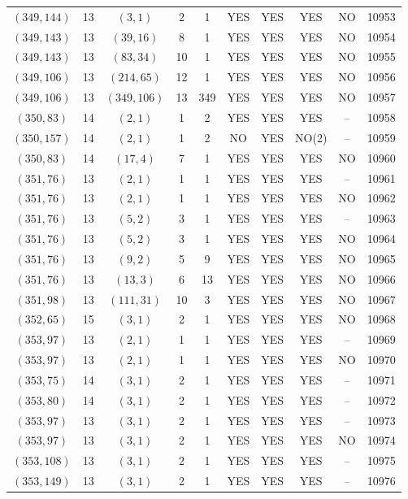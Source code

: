 \begin{longtable}{|c|c|c|c|c|c|c|c|c|c|}
$(349, 144)$ & 13 & $(3, 1)$ & 2 & 1 & YES & YES & YES & NO & 10953\\
$(349, 143)$ & 13 & $(39, 16)$ & 8 & 1 & YES & YES & YES & NO & 10954\\
$(349, 143)$ & 13 & $(83, 34)$ & 10 & 1 & YES & YES & YES & NO & 10955\\
$(349, 106)$ & 13 & $(214, 65)$ & 12 & 1 & YES & YES & YES & NO & 10956\\
$(349, 106)$ & 13 & $(349, 106)$ & 13 & 349 & YES & YES & YES & NO & 10957\\
$(350, 83)$ & 14 & $(2, 1)$ & 1 & 2 & YES & YES & YES & -- & 10958\\
$(350, 157)$ & 14 & $(2, 1)$ & 1 & 2 & NO & YES & NO(2) & -- & 10959\\
$(350, 83)$ & 14 & $(17, 4)$ & 7 & 1 & YES & YES & YES & NO & 10960\\
$(351, 76)$ & 13 & $(2, 1)$ & 1 & 1 & YES & YES & YES & -- & 10961\\
$(351, 76)$ & 13 & $(2, 1)$ & 1 & 1 & YES & YES & YES & NO & 10962\\
$(351, 76)$ & 13 & $(5, 2)$ & 3 & 1 & YES & YES & YES & -- & 10963\\
$(351, 76)$ & 13 & $(5, 2)$ & 3 & 1 & YES & YES & YES & NO & 10964\\
$(351, 76)$ & 13 & $(9, 2)$ & 5 & 9 & YES & YES & YES & NO & 10965\\
$(351, 76)$ & 13 & $(13, 3)$ & 6 & 13 & YES & YES & YES & NO & 10966\\
$(351, 98)$ & 13 & $(111, 31)$ & 10 & 3 & YES & YES & YES & NO & 10967\\
$(352, 65)$ & 15 & $(3, 1)$ & 2 & 1 & YES & YES & YES & NO & 10968\\
$(353, 97)$ & 13 & $(2, 1)$ & 1 & 1 & YES & YES & YES & -- & 10969\\
$(353, 97)$ & 13 & $(2, 1)$ & 1 & 1 & YES & YES & YES & NO & 10970\\
$(353, 75)$ & 14 & $(3, 1)$ & 2 & 1 & YES & YES & YES & -- & 10971\\
$(353, 80)$ & 14 & $(3, 1)$ & 2 & 1 & YES & YES & YES & -- & 10972\\
$(353, 97)$ & 13 & $(3, 1)$ & 2 & 1 & YES & YES & YES & -- & 10973\\
$(353, 97)$ & 13 & $(3, 1)$ & 2 & 1 & YES & YES & YES & NO & 10974\\
$(353, 108)$ & 13 & $(3, 1)$ & 2 & 1 & YES & YES & YES & -- & 10975\\
$(353, 149)$ & 13 & $(3, 1)$ & 2 & 1 & YES & YES & YES & -- & 10976\\

\end{longtable}
